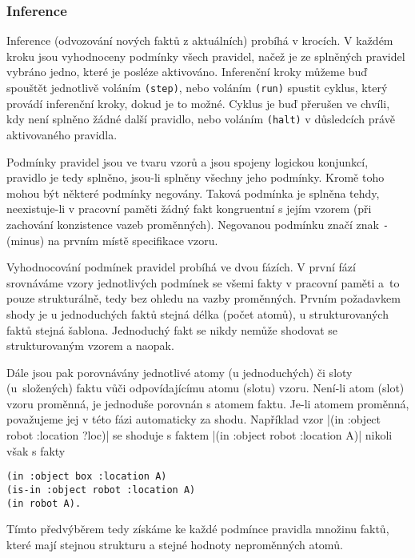 \subsubsection{Inference}
\label{inference}

Inference (odvozování nových faktů z aktuálních) probíhá v krocích. V každém
kroku jsou vyhodnoceny podmínky všech pravidel, načež je ze splněných pravidel
vybráno jedno, které je posléze aktivováno. Inferenční kroky můžeme buď spouštět
jednotlivě voláním \verb|(step)|, nebo voláním \verb|(run)| spustit
cyklus, který provádí inferenční kroky, dokud je to možné. Cyklus je buď
přerušen ve chvíli, kdy není splněno žádné další pravidlo, nebo voláním
\verb|(halt)| v důsledcích právě aktivovaného pravidla.

Podmínky pravidel jsou ve tvaru vzorů a jsou spojeny logickou konjunkcí,
pravidlo je tedy splněno, jsou-li splněny všechny jeho podmínky. Kromě toho
mohou být některé podmínky negovány. Taková podmínka je splněna tehdy,
neexistuje-li v pracovní paměti žádný fakt kongruentní s jejím vzorem (při
zachování konzistence vazeb proměnných). Negovanou podmínku značí znak \verb|-|
(minus) na prvním místě specifikace vzoru.

Vyhodnocování podmínek pravidel probíhá ve dvou fázích. V první fází srovnáváme
vzory jednotlivých podmínek se všemi fakty v pracovní paměti a~to pouze
strukturálně, tedy bez ohledu na vazby proměnných. Prvním požadavkem shody je u
jednoduchých faktů stejná délka (počet atomů), u strukturovaných faktů stejná
šablona. Jednoduchý fakt se nikdy nemůže shodovat se strukturovaným vzorem a
naopak.

Dále jsou pak porovnávány jednotlivé atomy (u jednoduchých) či
sloty (u~složených) faktu vůči odpovídajícímu atomu (slotu) vzoru. Není-li atom
(slot) vzoru proměnná, je jednoduše porovnán s atomem faktu. Je-li atomem
proměnná, považujeme jej v této fázi automaticky za shodu. Například vzor
\cl|(in :object robot :location ?loc)|
se shoduje s faktem
\cl|(in :object robot :location A)|
nikoli však s fakty
\begin{verbatim}
(in :object box :location A)
(is-in :object robot :location A)
(in robot A).
\end{verbatim}
Tímto předvýběrem
tedy získáme ke každé podmínce pravidla množinu faktů, které mají stejnou
strukturu a stejné hodnoty neproměnných atomů.

